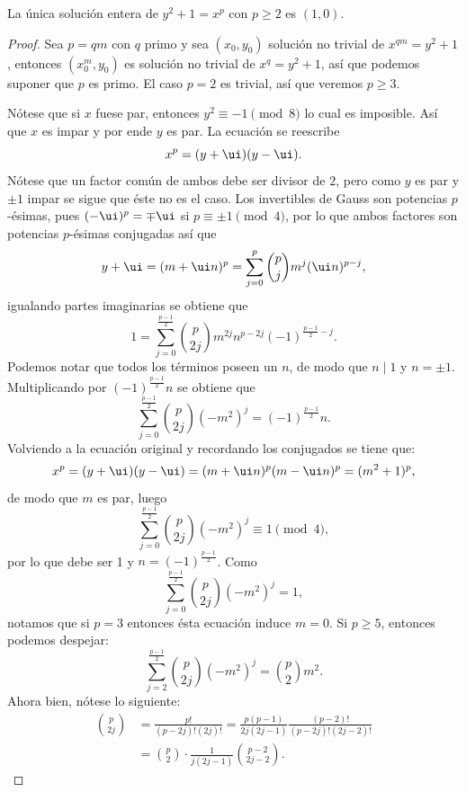 \documentclass[11pt, reqno]{amsart}
\begin{document}
\begin{thm}[V.A. Lebesgue, 1850]\label{thm:lebesgue_1850_catalan}
	La única solución entera de $y^2 + 1 = x^p$ con $p \ge 2$ es $(1, 0)$.
\end{thm}
\begin{proof}
	Sea $p = qm$ con $q$ primo y sea $(x_0, y_0)$ solución no trivial de $x^{qm} = y^2 + 1$, entonces $(x_0^m, y_0)$ es solución no trivial
	de $x^q = y^2 + 1$, así que podemos suponer que $p$ es primo.
	El caso $p = 2$ es trivial, así que veremos $p \ge 3$.

	Nótese que si $x$ fuese par, entonces $y^2 \equiv -1 \pmod 8$ lo cual es imposible.
	Así que $x$ es impar y por ende $y$ es par. La ecuación se reescribe
	$$ x^p = (y + \ui)(y - \ui). $$
	Nótese que un factor común de ambos debe ser divisor de $2$, pero como $y$ es par y $\pm 1$ impar se sigue que éste no es el caso.
	Los invertibles de Gauss son potencias $p$-ésimas, pues $(-\ui)^p = \mp\ui$ si $p \equiv \pm 1 \pmod 4$, por lo que ambos factores
	son potencias $p$-ésimas conjugadas así que
	$$ y + \ui = (m + \ui n)^p = \sum_{j=0}^{p} \binom{p}{j} m^j(\ui n)^{p - j}, $$
	igualando partes imaginarias se obtiene que
	$$ 1 = \sum_{j=0}^{\frac{p-1}{2}} \binom{p}{2j} m^{2j} n^{p - 2j} (-1)^{\frac{p-1}{2} - j}. $$
	Podemos notar que todos los términos poseen un $n$, de modo que $n \mid 1$ y $n = \pm 1$.
	Multiplicando por $(-1)^{\frac{p-1}{2}} n$ se obtiene que
	$$ \sum_{j=0}^{\frac{p-1}{2}} \binom{p}{2j} (-m^2)^j = (-1)^{\frac{p-1}{2}} n. $$
	Volviendo a la ecuación original y recordando los conjugados se tiene que:
	$$ x^p = (y + \ui)(y - \ui) = (m + \ui n)^p (m - \ui n)^p = (m^2 + 1)^p, $$
	de modo que $m$ es par, luego 
	$$ \sum_{j=0}^{\frac{p-1}{2}} \binom{p}{2j} (-m^2)^j \equiv 1 \pmod 4, $$
	por lo que debe ser 1 y $n = (-1)^{\frac{p-1}{2}}$. Como
	$$ \sum_{j=0}^{\frac{p-1}{2}} \binom{p}{2j} (-m^2)^j = 1, $$
	notamos que si $p = 3$ entonces ésta ecuación induce $m = 0$.
	Si $p \ge 5$, entonces podemos despejar:
	\begin{equation}
		\sum_{j=2}^{\frac{p-1}{2}} \binom{p}{2j} (-m^2)^j = \binom{p}{2} m^2.
		\label{eq:mordell_halfway_id}
	\end{equation}
	Ahora bien, nótese lo siguiente:
	\begin{align*}
		\binom{p}{2j} &= \frac{p!}{(p - 2j)! (2j)!} = \frac{p(p-1)}{2j(2j - 1)} \frac{(p - 2)!}{(p - 2j)!(2j - 2)!} \\
			      &= \binom{p}{2} \cdot \frac{1}{j(2j - 1)} \binom{p - 2}{2j - 2}.
	\end{align*}

\end{proof}
\end{document}
